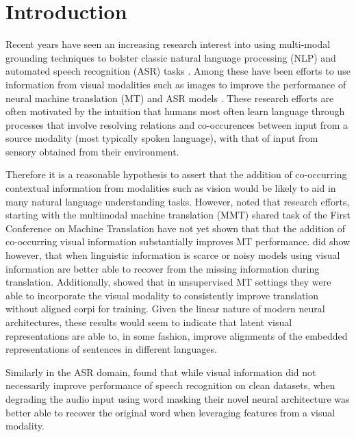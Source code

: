 \chapter{Introduction}
%

Recent years have seen an increasing research interest into using multi-modal grounding techniques to bolster classic natural language processing (NLP) and automated speech recognition (ASR) tasks \citeme.
Among these have been efforts to use information from visual modalities such as images to improve the performance of neural machine translation (MT) and ASR models \citeme.
These research efforts are often motivated by the intuition that humans most often learn language through processes that involve resolving relations and co-occurences between input from a source modality (most typically spoken language), with that of input from sensory obtained from their environment.

Therefore it is a reasonable hypothesis to assert that the addition of co-occurring contextual information from modalities such as vision would be likely to aid in many natural language understanding tasks. 
However,  noted that research efforts, starting with the multimodal machine translation (MMT) shared task of the First Conference on Machine Translation have not yet shown that that the addition of co-occurring visual information substantially improves MT performance.
\citeme[Caglayan] did show however, that when linguistic information is scarce or noisy models using visual information are better able to recover from the missing information during translation.
Additionally,  showed that in unsupervised MT settings they were able to incorporate the visual modality to consistently improve translation without aligned corpi for training.
Given the linear nature of modern neural architectures, these results would seem to indicate that latent visual representations are able to, in some fashion, improve alignments of the embedded representations of sentences in different languages.

Similarly in the ASR domain,   found that while visual information did not necessarily improve performance of speech recognition on clean datasets, when degrading the audio input using word masking their novel neural architecture was better able to  recover the original word when leveraging features from a visual modality.

